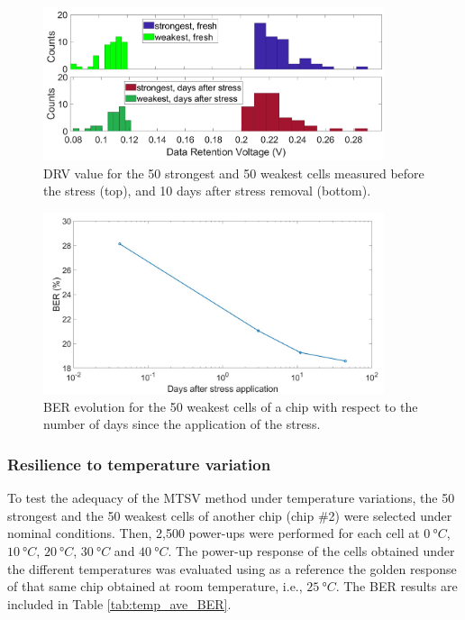 \begin{figure}[H]
    \centering
    \includegraphics[width=10cm]{images/DRV_hist_stress.jpg}
    \caption{DRV value for the 50 strongest and 50 weakest cells measured before the stress (top), and 10 days after stress removal (bottom). }
    \label{fig:DRV_hist_stress}
\end{figure}

\begin{figure}[H]
    \centering
    \includegraphics[width=10cm]{images/BER evolution.jpg}
    \caption{BER evolution for the 50 weakest cells of a chip with respect to the number of days since the application of the stress. }
    \label{fig:BER_ev}
\end{figure}

\subsubsection{Resilience to temperature variation}

To test the adequacy of the MTSV method under temperature variations, the 50 strongest and the 50 weakest cells of another chip (chip \#2) were selected under nominal conditions. Then, 2,500 power-ups were performed for each cell at $\SI{0}{\degree C}$, $\SI{10}{\degree C}$, $\SI{20}{\degree C}$, $\SI{30}{\degree C}$ and $\SI{40}{\degree C}$. The power-up response of the cells obtained under the different temperatures was evaluated using as a reference the golden response of that same chip obtained at room temperature, i.e., $\SI{25}{\degree C}$. The BER results are included in Table \ref{tab:temp_ave_BER}. 


